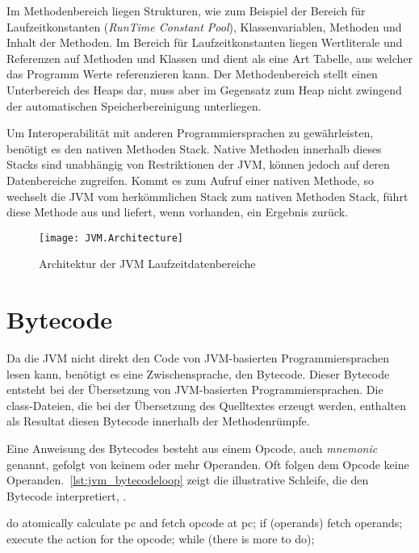 Im Methodenbereich liegen Strukturen, wie zum Beispiel der Bereich für Laufzeitkonstanten (\textit{Run\-Time Constant Pool}), Klassenvariablen, Methoden und Inhalt der Methoden. Im Bereich für Laufzeitkonstanten liegen Wertliterale und Referenzen auf Methoden und Klassen und dient als eine Art Tabelle, aus welcher das Programm Werte referenzieren kann.  Der Methodenbereich stellt einen Unterbereich des Heaps dar, muss aber im Gegensatz zum Heap nicht zwingend der automatischen Speicherbereinigung unterliegen.

Um Interoperabilität mit anderen Programmiersprachen zu gewährleisten, benötigt es den nativen Methoden Stack. Native Methoden innerhalb dieses Stacks sind unabhängig von Restriktionen der JVM, können jedoch auf deren Datenbereiche zugreifen. Kommt es zum Aufruf einer nativen Methode, so wechselt die JVM vom herkömmlichen Stack zum nativen Methoden Stack, führt diese Methode aus und liefert, wenn vorhanden, ein Ergebnis zurück.

\begin{figure}
    \caption{Architektur der JVM Laufzeitdatenbereiche}
    \centering
    \texttt{[image: JVM.Architecture]}
    \label{fig:jvm-architecture}
\end{figure}

\section{Bytecode}

Da die JVM nicht direkt den Code von JVM-basierten Programmiersprachen lesen kann, benötigt es eine Zwischensprache, den Bytecode. Dieser Bytecode entsteht bei der Übersetzung von JVM-basierten Programmiersprachen. Die class-Dateien, die bei der Übersetzung des Quelltextes erzeugt werden, enthalten als Resultat diesen Bytecode innerhalb der Methodenrümpfe.

Eine Anweisung des Bytecodes besteht aus einem Opcode, auch \textit{mnemonic} genannt, gefolgt von keinem oder mehr Operanden. Oft folgen dem Opcode keine Operanden.~\autoref{lst:jvm_bytecodeloop} zeigt die illustrative Schleife, die den Bytecode interpretiert, \cite[siehe S. 25]{lindholm2016java}.

\begin{JavaCode}[numbers=none, caption={Auszug aus der JVM Spezifikation, welche die Interpretationsschleife für Bytecode repräsentiert.}, label=lst:jvm_bytecodeloop]
do {
    atomically calculate pc and fetch opcode at pc;
    if (operands) fetch operands;
    execute the action for the opcode;
} while (there is more to do);
\end{JavaCode}

